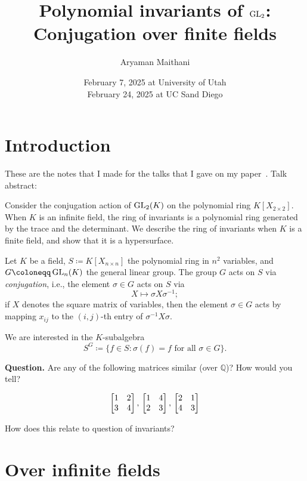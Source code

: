 \documentclass[12pt]{article}
\title{Polynomial invariants of \texorpdfstring{$\operatorname{GL}_{2}$}{GL(2)}: Conjugation over finite fields}
\author{Aryaman Maithani}
\date{%
February 7, 2025 at University of Utah \\ 
February 24, 2025 at UC Sand Diego %
}
\begin{document}
\maketitle

\section*{Introduction}

	These are the notes that I made for the talks that I gave on my paper~\Cite{Maithani:Conjugation}. Talk abstract: \newline

	\begin{blockquote}
		Consider the conjugation action of $\operatorname{GL}_{2}(K)$ on the polynomial ring $K[X_{2 \times 2}]$. 
		When $K$ is an infinite field, the ring of invariants is a polynomial ring generated by the trace and the determinant. 
		We describe the ring of invariants when $K$ is a finite field, and show that it is a hypersurface.
	\end{blockquote}

	Let $K$ be a field, $S \coloneqq K[X_{n \times n}]$ the polynomial ring in $n^{2}$ variables, and $G \coloneqq \GL_{n}(K)$ the general linear group. 
	The group $G$ acts on $S$ via \emph{conjugation}, i.e., the element $\sigma \in G$ acts on $S$ via
	\begin{equation*} 
		X \mapsto \sigma X \sigma^{-1};
	\end{equation*}
	if $X$ denotes the square matrix of variables, then the element $\sigma \in G$ acts by mapping $x_{ij}$ to the $(i, j)$-th entry of $\sigma^{-1} X \sigma$. 

	We are interested in the $K$-subalgebra
	\begin{equation*} 
		S^{G} \coloneqq \{f \in S : \sigma(f) = f \text{ for all } \sigma \in G\}.
	\end{equation*}

	\textbf{Question.} Are any of the following matrices similar (over $\mathbb{Q}$)? How would you tell?

	\begin{equation*} 
		\begin{bmatrix} 1 & 2 \\ 3 & 4 \end{bmatrix},\, \begin{bmatrix} 1 & 4 \\ 2 & 3 \end{bmatrix},\, \begin{bmatrix} 2 & 1 \\ 4 & 3 \end{bmatrix}
	\end{equation*}

	How does this relate to question of invariants? 

\section{Over infinite fields}
\end{document}
